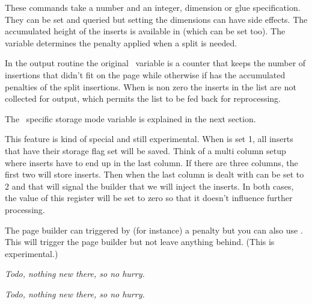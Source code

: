 These commands take a number and an integer, dimension or glue specification.
They can be set and queried but setting the dimensions can have side effects. The
accumulated height of the inserts is available in \type {\insertheights} (which
can be set too). The \type {\floatingpenalty} variable determines the penalty
applied when a split is needed.

In the output routine the original \TEX\ variable \type {\insertpenalties} is a
counter that keeps the number of insertions that didn't fit on the page while
otherwise if has the accumulated penalties of the split insertions. When \type
{\holdinginserts} is non zero the inserts in the list are not collected for
output, which permits the list to be fed back for reprocessing.

The \LUAMETATEX\ specific storage mode \type {\insertstoring} variable is
explained in the next section.

\stopsectionlevel

\startsectionlevel[title=Storing]

This feature is kind of special and still experimental. When \type
{\insertstoring} is set 1, all inserts that have their storage flag set will be
saved. Think of a multi column setup where inserts have to end up in the last
column. If there are three columns, the first two will store inserts. Then when
the last column is dealt with \type {\insertstoring} can be set to 2 and that
will signal the builder that we will inject the inserts. In both cases, the value
of this register will be set to zero so that it doesn't influence further
processing.

\stopsectionlevel

\startsectionlevel[title=Synchronizing]

The page builder can triggered by (for instance) a penalty but you can also use
\type {\pageboundary}. This will trigger the page builder but not leave anything
behind. (This is experimental.)

\stopsectionlevel

\startsectionlevel[title=Migration]

{\em Todo, nothing new there, so no hurry.}

\stopsectionlevel

\startsectionlevel[title=Callbacks]

{\em Todo, nothing new there, so no hurry.}

\stopsectionlevel

\stopdocument
